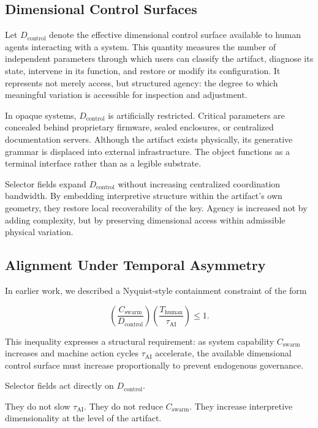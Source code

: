 \documentclass[11pt]{article}
\begin{document}
\subsection{Dimensional Control Surfaces}

Let $D_{\text{control}}$ denote the effective dimensional control surface
available to human agents interacting with a system. This quantity
measures the number of independent parameters through which users can
classify the artifact, diagnose its state, intervene in its function,
and restore or modify its configuration. It represents not merely
access, but structured agency: the degree to which meaningful variation
is accessible for inspection and adjustment.

In opaque systems, $D_{\text{control}}$ is artificially restricted.
Critical parameters are concealed behind proprietary firmware, sealed
enclosures, or centralized documentation servers. Although the artifact
exists physically, its generative grammar is displaced into external
infrastructure. The object functions as a terminal interface rather than
as a legible substrate.

Selector fields expand $D_{\text{control}}$ without increasing
centralized coordination bandwidth. By embedding interpretive structure
within the artifact’s own geometry, they restore local recoverability of
the key. Agency is increased not by adding complexity, but by preserving
dimensional access within admissible physical variation.

\subsection{Alignment Under Temporal Asymmetry}

In earlier work, we described a Nyquist-style containment constraint of the form

\[
\left( \frac{C_{\text{swarm}}}{D_{\text{control}}} \right)
\left( \frac{T_{\text{human}}}{\tau_{\text{AI}}} \right) \leq 1.
\]

This inequality expresses a structural requirement: as system capability 
$C_{\text{swarm}}$ increases and machine action cycles $\tau_{\text{AI}}$ 
accelerate, the available dimensional control surface must increase 
proportionally to prevent endogenous governance.

Selector fields act directly on $D_{\text{control}}$.

They do not slow $\tau_{\text{AI}}$.
They do not reduce $C_{\text{swarm}}$.
They increase interpretive dimensionality at the level of the artifact.
\end{document}
